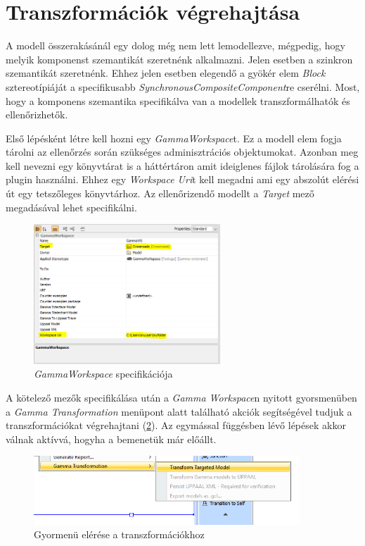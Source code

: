 \section{Transzformációk végrehajtása}

A modell összerakásánál egy dolog még nem lett lemodellezve, mégpedig, hogy melyik komponenst szemantikát szeretnénk alkalmazni. Jelen esetben a szinkron szemantikát szeretnénk. Ehhez jelen esetben elegendő a gyökér elem \emph{Block} sztereotípiáját a specifikusabb \emph{SynchronousCompositeComponent}re cserélni.
Most, hogy a komponens szemantika specifikálva van a modellek transzformálhatók és ellenőrizhetők.

Első lépésként létre kell hozni egy \emph{GammaWorkspace}t. Ez a modell elem fogja tárolni az ellenőrzés során szükséges adminisztrációs objektumokat. Azonban meg kell nevezni egy könyvtárat is a háttértáron amit ideiglenes fájlok tárolására fog a plugin használni. Ehhez egy \emph{Workspace Uri}t kell megadni ami egy abszolút elérési út egy tetszőleges könyvtárhoz. Az ellenőrizendő modellt a \emph{Target} mező megadásával lehet specifikálni.

\begin{figure}[!ht]
	\centering
	\includegraphics[width=7cm, keepaspectratio]{figures/contribution/GammaWS.png}
	\caption{\emph{GammaWorkspace} specifikációja}
	\label{fig:GammaWS}
\end{figure}


A kötelező mezők specifikálása után a \emph{Gamma Workspace}n nyitott gyorsmenüben a \emph{Gamma Transformation} menüpont alatt található akciók segítségével tudjuk a transzformációkat végrehajtani (\ref{fig:gamma-tra}). Az egymással függésben lévő lépések akkor válnak aktívvá, hogyha a bemenetük már előállt.

\begin{figure}[!ht]
	\centering
	\includegraphics[width=10cm, keepaspectratio]{figures/contribution/GammaTransformation.png}
	\caption{Gyormenü elérése a transzformációkhoz}
	\label{fig:gamma-tra}
\end{figure}

